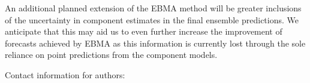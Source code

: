 \documentclass[pdftex,12pt,fullpage,oneside]{amsart}
\begin{document}
An additional planned extension of the EBMA method will be greater
inclusions of the uncertainty in component estimates in the final
ensemble predictions.  We anticipate that this may aid us
to even further increase the improvement of forecasts achieved by EBMA
as this information is currently lost through the sole reliance on
point predictions from the component models.  



\singlespacing


 


\newpage

Contact information for authors:
\end{document}

